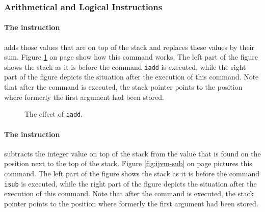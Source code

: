 \subsubsection{Arithmetical and Logical Instructions}

\paragraph{The instruction }
adds those values that are on top of the stack and replaces these values by their sum.
Figure \ref{fig:ijvm-add} on page \pageref{fig:ijvm-add} show how this command works.
The left part of the figure shows the stack as it is before the command \texttt{iadd} is executed,
while the right part of the figure depicts the situation after the execution of this command.  Note
that after the command is executed, the stack pointer points to the position where formerly the
first argument had been stored.


\setlength{\unitlength}{0.5cm}
\begin{figure}[!ht]
  \centering
{}
  \caption{The effect of \texttt{iadd}.}
  \label{fig:ijvm-add}
\end{figure}

\paragraph{The instruction }
subtracts the integer value on top of the stack from the value that is found on the position next to
the top of the stack.
Figure \ref{fig:ijvm-sub} on page \pageref{fig:ijvm-sub} pictures this command.
The left part of the figure shows the stack as it is before the command \texttt{isub} is executed,
while the right part of the figure depicts the situation after the execution of this command.  Note
that after the command is executed, the stack pointer points to the position where formerly the
first argument had been stored.



